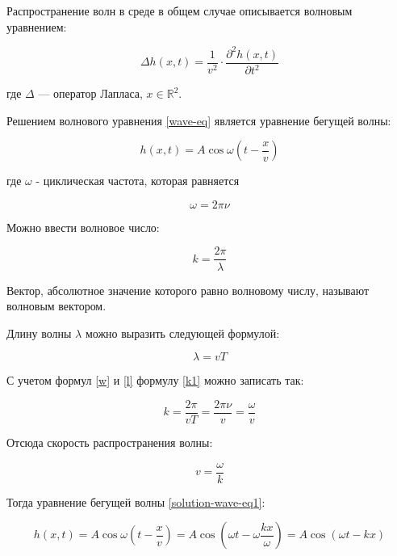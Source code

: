 Распространение волн в среде в общем случае описывается волновым уравнением:

\begin{equation}
    \label{wave-eq}
    \Delta h(x,t) = \frac{1}{v^2} \cdot \frac{\partial ^2h(x,t)}{\partial t^2}
\end{equation}

где $\Delta$ --- оператор Лапласа, $x \in \mathbb{R}^2$. 

Решением волнового уравнения \ref{wave-eq} является уравнение бегущей волны:

\begin{equation}
    \label{solution-wave-eq1}
    h(x,t) = A \cos \omega (t - \frac{x}{v})
\end{equation}

где $\omega$ - циклическая частота, которая равняется

\begin{equation}
    \label{w}
    \omega = 2\pi \nu
\end{equation}

Можно ввести волновое число:

\begin{equation}
    \label{k1}
    k = \frac{2\pi}{\lambda}
\end{equation}

Вектор, абсолютное значение которого равно волновому числу, называют волновым вектором.

Длину волны $\lambda$ можно выразить следующей формулой:

\begin{equation}
    \label{l}
    \lambda = vT
\end{equation}

С учетом формул \ref{w} и \ref{l} формулу \ref{k1} можно записать так:

\begin{equation}
    \label{k2}
    k = \frac{2\pi}{vT} = \frac{2\pi \nu}{v} = \frac{\omega}{v}
\end{equation}

Отсюда скорость распространения волны:

\begin{equation}
    \label{speed}
    v = \frac{\omega}{k}
\end{equation}

Тогда уравнение бегущей волны \ref{solution-wave-eq1}:

\begin{equation}
    \label{solution-wave-eq2}
    h(x,t) = A \cos \omega (t - \frac{x}{v}) = A \cos (\omega t - \omega \frac{kx}{\omega}) = A \cos (\omega t - kx)
\end{equation}

